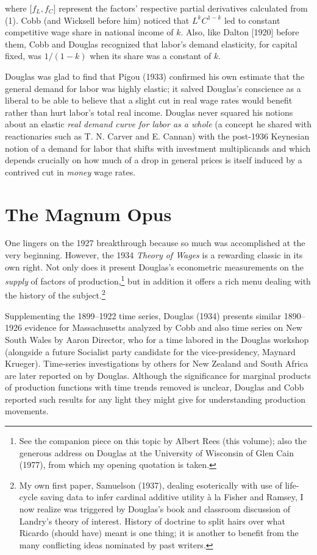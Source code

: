 \documentclass{article}
\begin{document}
\noindent where \(\lbrack f_L,f_C \rbrack\) represent the factors' respective partial derivatives calculated from (1). Cobb (and Wicksell before him) noticed that \(L^kC^{1-k}\) led to constant competitive wage share in national income of \(k\). Also, like Dalton [1920] before them, Cobb and Douglas recognized that labor's demand elasticity, for capital fixed, was \(1/(1-k)\) when its share was a constant of \(k\).

Douglas was glad to find that Pigou (1933) confirmed his own estimate that the general demand for labor was highly elastic; it salved Douglas's conscience as a liberal to be able to believe that a slight cut in real wage rates would benefit rather than hurt labor's total real income. Douglas never squared his notions about an elastic \emph{real demand curve for labor as a whole} (a concept he shared with reactionaries such as T. N. Carver and E. Cannan) with the post-1936 Keynesian notion of a demand for labor that shifts with investment multiplicands and which depends crucially on how much of a drop in general prices is itself induced by a contrived cut in \emph{money} wage rates.

% 


\section*{The Magnum Opus}

One lingers on the 1927 breakthrough because so much was accomplished at the very beginning. However, the 1934 \emph{Theory of Wages} is a rewarding classic in its own right. Not only does it present Douglas's econometric measurements on the \emph{supply} of factors of production,\footnote{See the companion piece on this topic by Albert Rees (this volume); also the generous address on Douglas at the University of Wisconsin of Glen Cain (1977), from which my opening quotation is taken.} but in addition it offers a rich menu dealing with the history of the subject.\footnote{My own first paper, Samuelson (1937), dealing esoterically with use of life-cycle saving data to infer cardinal additive utility \`a la Fisher and Ramsey, I now realize was triggered by Douglas's book and classroom discussion of Landry's theory of interest. History of doctrine to split hairs over what Ricardo (should have) meant is one thing; it is another to benefit from the many conflicting ideas nominated by past writers.}

Supplementing the 1899--1922 time series, Douglas (1934) presents similar 1890--1926 evidence for Massachusetts analyzed by Cobb and also time series on New South Wales by Aaron Director, who for a time labored in the Douglas workshop (alongside a future Socialist party candidate for the vice-presidency, Maynard Krueger). Time-series investigations by others for New Zealand and South Africa are later reported on by Douglas. Although the significance for marginal products of production functions with time trends removed is unclear, Douglas and Cobb reported such results for any light they might give for understanding production movements.
\end{document}
